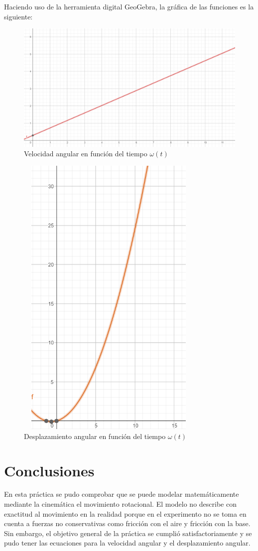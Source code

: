\documentclass[a4paper]{article}
\begin{document}
Haciendo uso de la herramienta digital GeoGebra, la gráfica de las funciones es la siguiente:

\begin{figure} [H]
    \centering
    \includegraphics[width=0.6 \textwidth]{omega(t).png}
    \caption{Velocidad angular en función del tiempo $\omega (t)$}
    \label{omega}
\end{figure}

\begin{figure} [H]
    \centering
    \includegraphics[width=9cm, height=14cm]{theta(t).png}
    \caption{Desplazamiento angular en función del tiempo $\omega (t)$}
    \label{theta}
\end{figure}

\section{Conclusiones}
En esta práctica se pudo comprobar que se puede modelar matemáticamente mediante la cinemática el movimiento rotacional. El modelo no describe con exactitud al movimiento en la realidad porque en el experimento no se toma en cuenta a fuerzas no conservativas como fricción con el aire y fricción con la base. Sin embargo, el objetivo general de la práctica se cumplió satisfactoriamente y se pudo tener las ecuaciones para la velocidad angular y el desplazamiento angular.
\end{document}
